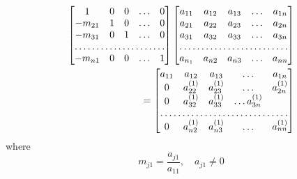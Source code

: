 \documentclass[a4paper]{article}
\begin{document}
\begin{equation}
	\label{step_1}
	\begin{split}
	\begin{bmatrix} 
	1 & 0 & 0 & \ldots & 0\\
	-m_{21} & 1 & 0 & \ldots & 0\\
	-m_{31} & 0 & 1 & \ldots & 0 \\
	\hdotsfor{5}\\
	-m_{n 1} & 0 & 0 & \ldots & 1\end{bmatrix}
	\begin{bmatrix}
	a_{11} & a_{12} & a_{13} & \ldots & a_{1n}\\
	a_{21} & a_{22} & a_{23} & \ldots & a_{2n}\\
	a_{31} & a_{32} & a_{33} & \ldots & a_{3 n}\\
	\hdotsfor{5}\\
	a_{n_1} & a_{n 2} & a_{n 3} & \ldots & a_{n n}\end{bmatrix} \\
	= \begin{bmatrix} 
	a_{11} & a_{12} & a_{13} & \ldots & a_{1 n}\\
	0 & a_{22}^{(1)} & a_{23}^{(1)} & \ldots & a_{2 n}^{(1)}\\
	0 & a_{32}^{(1)} & a_{33}^{(1)} & \ldots a_{3 n}^{(1)}\\
	\hdotsfor{5}\\
	0 & a_{n2}^{(1)} & a_{n 3}^{(1)} &\ldots & a_{n n}^{(1)}
\end{bmatrix}
	\end{split}
\end{equation}
where
\begin{equation}
	m_{j 1} = \frac{a_{j1}}{a_{1 1}}, \quad a_{j 1} \neq  0
\end{equation}
\end{document}
